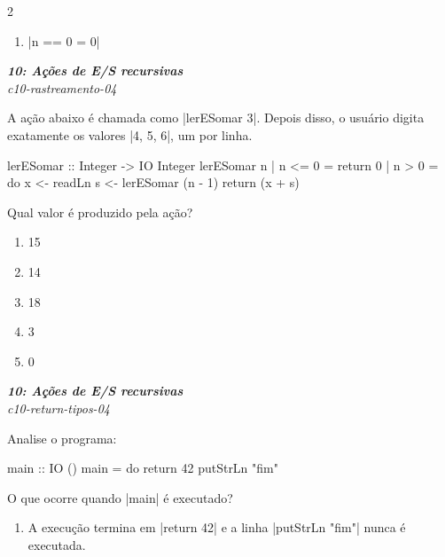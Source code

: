 \documentclass[a4paper,10pt,brazil]{article}
\begin{document}
\begin{multicols}{2}
\begin{enumerate}
  \item \haskellinline|n == 0 = 0|


\end{enumerate}

\begin{flushright}
  \footnotesize
  \textit{\textbf{10: Ações de E/S recursivas}}\\
  \textit{c10-rastreamento-04}\\

\end{flushright}
A ação abaixo é chamada como \haskellinline|lerESomar 3|. Depois disso, o usuário digita exatamente os valores \haskellinline|4, 5, 6|, um por linha.

\begin{haskellcode}
lerESomar :: Integer -> IO Integer
lerESomar n
  | n <= 0 = return 0
  | n > 0  = do
      x <- readLn
      s <- lerESomar (n - 1)
      return (x + s)
\end{haskellcode}

Qual valor é produzido pela ação?

\begin{enumerate}
  \item 15

  \item 14

  \item 18

  \item 3

  \item 0


\end{enumerate}

\begin{flushright}
  \footnotesize
  \textit{\textbf{10: Ações de E/S recursivas}}\\
  \textit{c10-return-tipos-04}\\

\end{flushright}
Analise o programa:

\begin{haskellcode}
main :: IO ()
main = do
  return 42
  putStrLn "fim"
\end{haskellcode}

O que ocorre quando \haskellinline|main| é executado?

\begin{enumerate}
  \item A execução termina em \haskellinline|return 42| e a linha \haskellinline|putStrLn "fim"| nunca é executada.


\end{enumerate}
\end{multicols}
\end{document}
